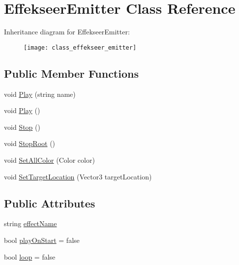 \hypertarget{class_effekseer_emitter}{\section{Effekseer\-Emitter Class Reference}
\label{class_effekseer_emitter}
}
Inheritance diagram for Effekseer\-Emitter\-:\begin{figure}[H]
\begin{center}
\leavevmode
\texttt{[image: class\_effekseer\_emitter]}
\end{center}
\end{figure}
\subsection*{Public Member Functions}
\begin{DoxyCompactItemize}
\item 
void \hyperlink{class_effekseer_emitter_a8ae6fd4f46274d56eee5de6b1de3ee9b}{Play} (string name)
\item 
void \hyperlink{class_effekseer_emitter_a55d07e8215485e43eaa94b7b075b2f04}{Play} ()
\item 
void \hyperlink{class_effekseer_emitter_acab7d9ae949cd0aa844ae66b2f44ad5d}{Stop} ()
\item 
void \hyperlink{class_effekseer_emitter_a6bb4daefa3632e823b684ba575043290}{Stop\-Root} ()
\item 
void \hyperlink{class_effekseer_emitter_a607376ba07571692ddef670ef0e12562}{Set\-All\-Color} (Color color)
\item 
void \hyperlink{class_effekseer_emitter_a39366319e460cc573d4bfc40803f6787}{Set\-Target\-Location} (Vector3 target\-Location)
\end{DoxyCompactItemize}
\subsection*{Public Attributes}
\begin{DoxyCompactItemize}
\item 
string \hyperlink{class_effekseer_emitter_a3c52af81c057a2f4ea0848cb492cf208}{effect\-Name}
\item 
bool \hyperlink{class_effekseer_emitter_a8ff5bc48852b4a21e3b33b0cd0e8b65a}{play\-On\-Start} = false
\item 
bool \hyperlink{class_effekseer_emitter_a9b6a18e54c4b4a68bb9b81fc88b123bd}{loop} = false
\end{DoxyCompactItemize}

